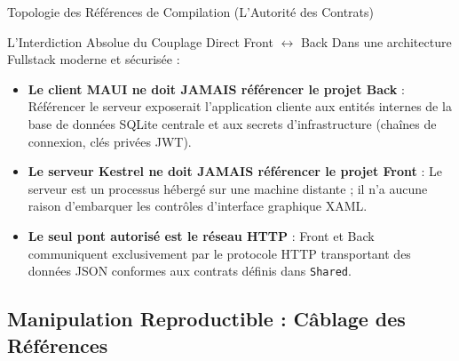\begin{schemabox}{Topologie des Références de Compilation (L'Autorité des Contrats)}
\begin{center}
\end{center}
\end{schemabox}

\vspace{0.2cm}

\begin{bestpracticebox}{L'Interdiction Absolue du Couplage Direct Front $\leftrightarrow$ Back}
Dans une architecture Fullstack moderne et sécurisée :
\begin{itemize}
    \item \textbf{Le client MAUI ne doit JAMAIS référencer le projet Back} : Référencer le serveur exposerait l'application cliente aux entités internes de la base de données SQLite centrale et aux secrets d'infrastructure (chaînes de connexion, clés privées JWT).
    \item \textbf{Le serveur Kestrel ne doit JAMAIS référencer le projet Front} : Le serveur est un processus hébergé sur une machine distante ; il n'a aucune raison d'embarquer les contrôles d'interface graphique XAML.
    \item \textbf{Le seul pont autorisé est le réseau HTTP} : Front et Back communiquent exclusivement par le protocole HTTP transportant des données JSON conformes aux contrats définis dans \texttt{Shared}.
\end{itemize}
\end{bestpracticebox}

\newpage

\subsection*{Manipulation Reproductible : Câblage des Références}


